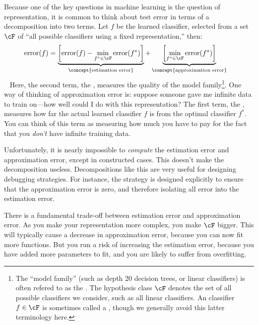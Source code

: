 Because one of the key questions in machine learning is the question of representation, it is common to think about test error in terms of a decomposition into two terms. Let $f$ be the learned classifier, selected from a set $\cF$ of ``all possible classifiers using a fixed representation,'' then:
~
\begin{align}
\text{error}(f)
&=
\underbrace{\left[ \text{error}(f) - \min_{f^* \in \cF} \text{error}(f^*) \right]}_{\text{\concept{estimation error}}}
+
\underbrace{\left[ \min_{f^* \in \cF} \text{error}(f^*) \right]}_{\text{\concept{approximation error}}}
\end{align}
~
Here, the second term, the , measures the quality of the model family\footnote{The ``model family'' (such as depth 20 decision trees, or linear classifiers) is often refered to as the . The hypothesis class $\cF$ denotes the set of all possible classifiers we consider, such as all linear classifiers. An classifier $f \in \cF$ is sometimes called a , though we generally avoid this latter terminology here.}. One way of thinking of approximation error is: suppose someone gave me infinite data to train on---how well could I do with this representation?
The first term, the , measures how far the actual learned classifier $f$ is from the optimal classifier $f^*$. You can think of this term as measuring how much you have to pay for the fact that you \emph{don't} have infinite training data.

Unfortunately, it is nearly impossible to \emph{compute} the estimation error and approximation error, except in constructed cases.
This doesn't make the decomposition useless.
Decompositions like this are very useful for designing debugging strategies.
For instance, the  strategy is designed explicitly to ensure that the approximation error is zero, and therefore isolating all error into the estimation error.

There is a fundamental trade-off between estimation error and approximation error.
As you make your representation more complex, you make $\cF$ bigger.
This will typically cause a decrease in approximation error, because you can now fit more functions.
But you run a risk of increasing the estimation error, because you have added more parameters to fit, and you are likely to suffer from overfitting.

